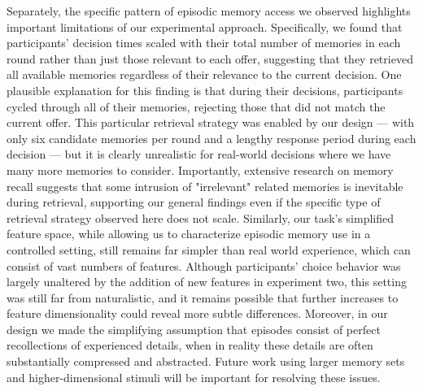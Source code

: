 \documentclass[10pt,letterpaper]{article}
\begin{document}
Separately, the specific pattern of episodic memory access we observed highlights important limitations of our experimental approach. Specifically, we found that participants' decision times scaled with their total number of memories in each round rather than just those relevant to each offer, suggesting that they retrieved all available memories regardless of their relevance to the current decision. One plausible explanation for this finding is that during their decisions, participants cycled through all of their memories, rejecting those that did not match the current offer. This particular retrieval strategy was enabled by our design --- with only six candidate memories per round and a lengthy response period during each decision --- but it is clearly unrealistic for real-world decisions where we have many more memories to consider. Importantly, extensive research on memory recall suggests that some intrusion of "irrelevant" related memories is inevitable during retrieval\cite{kahanaFoundationsHumanMemory2012}, supporting our general findings even if the specific type of retrieval strategy observed here does not scale. Similarly, our task's simplified feature space, while allowing us to characterize episodic memory use in a controlled setting, still remains far simpler than real world experience, which can consist of vast numbers of features. Although participants' choice behavior was largely unaltered by the addition of new features in experiment two, this setting was still far from naturalistic, and it remains possible that further increases to feature dimensionality could reveal more subtle differences. Moreover, in our design we made the simplifying assumption that episodes consist of perfect recollections of experienced details, when in reality these details are often substantially compressed and abstracted\cite{carmichaelExperimentalStudyEffect1932, nagySemanticCompressionEpisodic2018, zhouPatternSeparationUsing, kerrenExploringRoleDimensionality2025}. Future work using larger memory sets and higher-dimensional stimuli will be important for resolving these issues.
\end{document}
